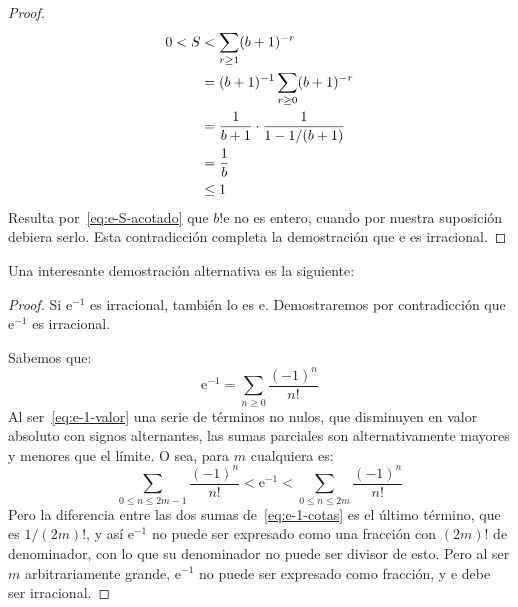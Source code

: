 \begin{proof}
    \begin{align}
      0 < S &<	 \sum_{r \ge 1} (b + 1)^{-r} \notag \\
	    &=	 (b + 1)^{-1} \sum_{r \ge 0} (b + 1)^{-r} \notag \\
	    &=	 \frac{1}{b + 1}
		   \cdot \frac{1}{1 - 1/(b + 1)} \notag \\
	    &=	 \frac{1}{b} \notag \\
	    &\le 1
	    \label{eq:e-S-acotado}
    \end{align}
    Resulta por~\eqref{eq:e-S-acotado}
    que \(b! \mathrm{e}\) no es entero,
    cuando por nuestra suposición debiera serlo.
    Esta contradicción completa la demostración
    que \(\mathrm{e}\) es irracional.
  \end{proof}
  Una interesante demostración alternativa es la siguiente:
  \begin{proof}
    Si \(\mathrm{e}^{-1}\) es irracional,
    también lo es \(\mathrm{e}\).
    Demostraremos por contradicción
    que \(\mathrm{e}^{-1}\) es irracional.%

    Sabemos que:
    \begin{equation}
      \label{eq:e-1-valor}
      \mathrm{e}^{-1}
	= \sum_{n \ge 0} \frac{(-1)^n}{n!}
    \end{equation}
    Al ser~\eqref{eq:e-1-valor} una serie de términos no nulos,
    que disminuyen en valor absoluto con signos alternantes,
    las sumas parciales
    son alternativamente mayores y menores que el límite.
    O sea,
    para \(m\) cualquiera es:
    \begin{equation}
      \label{eq:e-1-cotas}
      \sum_{0 \le n \le {2 m - 1}} \frac{(-1)^n}{n!}
	< \mathrm{e}^{-1}
	< \sum_{0 \le n \le {2 m}} \frac{(-1)^n}{n!}
    \end{equation}
    Pero la diferencia entre las dos sumas de~\eqref{eq:e-1-cotas}
    es el último término,
    que es \(1 / (2 m)!\),
    y así \(\mathrm{e}^{-1}\)
    no puede ser expresado como una fracción
    con \((2 m)!\) de denominador,
    con lo que su denominador no puede ser divisor de esto.
    Pero al ser \(m\) arbitrariamente grande,
    \(\mathrm{e}^{-1}\) no puede ser expresado como fracción,
    y \(\mathrm{e}\) debe ser irracional.
  \end{proof}

